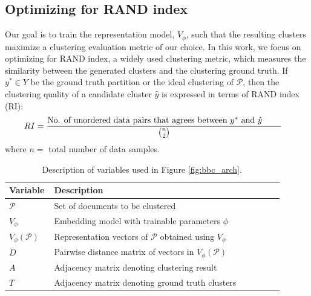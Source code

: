 \documentclass[11pt,a4paper]{article}
\begin{document}
\subsection{Optimizing for RAND index} Our goal is to train the representation model, $V_\phi$, such that the resulting clusters maximize a clustering evaluation metric of our choice. In this work, we focus on optimizing for RAND index, a widely used clustering metric, which measures the similarity between the generated clusters and the clustering ground truth. If $y^* \in Y$ be the ground truth partition or the ideal clustering of $\mathcal{P}$, then the clustering quality of a candidate cluster $\hat{y}$ is expressed in terms of RAND index (RI):
\begin{align*}
RI &= \frac{\parbox{0.8\linewidth}{No. of unordered data pairs that agrees between $y^*$ and $\hat{y}$}}{\binom{n}{2}}
\end{align*}
where %
$n=$ total number of data samples.

\begin{table}[t]
\begin{small}
\caption{Description of variables used in Figure \ref{fig:bbc_arch}.}
\begin{tabular}{p{0.1\linewidth}p{0.8\linewidth}}
\hline
Variable & Description \\ \hline
$\mathcal{P}$ & Set of documents to be clustered \\
$V_\phi$ & Embedding model with trainable parameters $\phi$ \\
$V_\phi(\mathcal{P})$ & Representation vectors of $\mathcal{P}$ obtained using $V_\phi$  \\
$D$ & Pairwise distance matrix of vectors in $V_\phi(\mathcal{P})$ \\
$A$ & Adjacency matrix denoting clustering result \\
$T$ & Adjacency matrix denoting ground truth clusters
\end{tabular}
\label{tab:bbc_arch}
\end{small}
\end{table}
\end{document}

